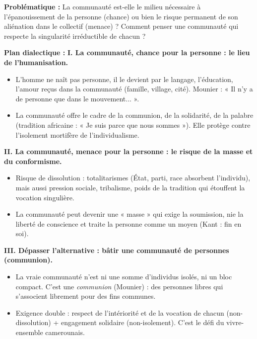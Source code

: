 \documentclass[11pt]{article}
\begin{document}
\begin{corrige}[Exercice 3]
\textbf{Problématique :} La communauté est-elle le milieu nécessaire à l'épanouissement de la personne (chance) ou bien le risque permanent de son aliénation dans le collectif (menace) ? Comment penser une communauté qui respecte la singularité irréductible de chacun ?

\textbf{Plan dialectique :}
\textbf{I. La communauté, chance pour la personne : le lieu de l'humanisation.}
\begin{itemize}
\item L'homme ne naît pas personne, il le devient par le langage, l'éducation, l'amour reçus dans la communauté (famille, village, cité). Mounier : « Il n'y a de personne que dans le mouvement... ».
\item La communauté offre le cadre de la communion, de la solidarité, de la palabre (tradition africaine : « Je suis parce que nous sommes »). Elle protège contre l'isolement mortifère de l'individualisme.
\end{itemize}

\textbf{II. La communauté, menace pour la personne : le risque de la masse et du conformisme.}
\begin{itemize}
\item Risque de dissolution : totalitarismes (État, parti, race absorbent l'individu), mais aussi pression sociale, tribalisme, poids de la tradition qui étouffent la vocation singulière.
\item La communauté peut devenir une « masse » qui exige la soumission, nie la liberté de conscience et traite la personne comme un moyen (Kant : fin en soi).
\end{itemize}

\textbf{III. Dépasser l'alternative : bâtir une communauté de personnes (communion).}
\begin{itemize}
\item La vraie communauté n'est ni une somme d'individus isolés, ni un bloc compact. C'est une \emph{communion} (Mounier) : des personnes libres qui s'associent librement pour des fins communes.
\item Exigence double : respect de l'intériorité et de la vocation de chacun (non-dissolution) + engagement solidaire (non-isolement). C'est le défi du vivre-ensemble camerounais.
\end{itemize}
\end{corrige}
\end{document}
